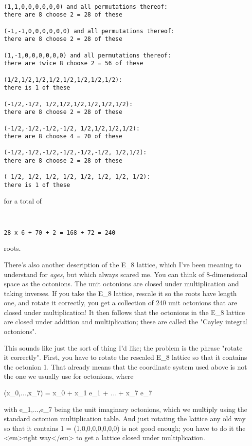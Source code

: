\begin{verbatim}

(1,1,0,0,0,0,0,0) and all permutations thereof:
there are 8 choose 2 = 28 of these

(-1,-1,0,0,0,0,0,0) and all permutations thereof:
there are 8 choose 2 = 28 of these

(1,-1,0,0,0,0,0,0) and all permutations thereof:
there are twice 8 choose 2 = 56 of these

(1/2,1/2,1/2,1/2,1/2,1/2,1/2,1/2):
there is 1 of these 

(-1/2,-1/2, 1/2,1/2,1/2,1/2,1/2,1/2):
there are 8 choose 2 = 28 of these

(-1/2,-1/2,-1/2,-1/2, 1/2,1/2,1/2,1/2):
there are 8 choose 4 = 70 of these

(-1/2,-1/2,-1/2,-1/2,-1/2,-1/2, 1/2,1/2): 
there are 8 choose 2 = 28 of these

(-1/2,-1/2,-1/2,-1/2,-1/2,-1/2,-1/2,-1/2): 
there is 1 of these
\end{verbatim}
    
for a total of 


\begin{verbatim}


28 x 6 + 70 + 2 = 168 + 72 = 240
\end{verbatim}
    
roots.  

There's also another description of the E_{8} lattice, which I've been
meaning to understand for \emph{ages}, but which always scared me.  You can
think of 8-dimensional space as the octonions.  The unit octonions are
closed under multiplication and taking inverses.  If you take the E_{8}
lattice, rescale it so the roots have length one, and rotate it
correctly, you get a collection of 240 unit octonions that are closed
under multiplication!  It then follows that the octonions in the E_{8}
lattice are closed under addition and multiplication; these are called
the "Cayley integral octonions".


This sounds like just the sort of thing I'd like; the problem is the
phrase "rotate it correctly".  First, you have to rotate the
rescaled E_{8} lattice so that it contains the octonion 1.  That already
means that the coordinate system used above is not the one we usually
use for octonions, where

(x_{0},...,x_{7}) = 
x_{0} + x_{1} e_{1} + ... + x_{7} e_{7}


with e_{1},...,e_{7} being the unit imaginary octonions,
which we multiply using the standard octonion multiplication table.  And
just rotating the lattice any old way so that it contains 1 =
(1,0,0,0,0,0,0,0) is not good enough; you have to do it the <em>right
way</em> to get a lattice closed under multiplication.


